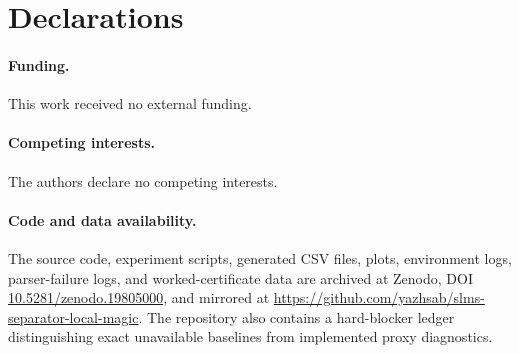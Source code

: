 \documentclass[a4paper,onecolumn,allowtoday]{quantumarticle}
\begin{document}












\section*{Declarations}

\paragraph*{Funding.} This work received no external funding.

\paragraph*{Competing interests.} The authors declare no competing interests.

\paragraph*{Code and data availability.} The source code, experiment scripts, generated CSV files, plots, environment logs, parser-failure logs, and worked-certificate data are archived at Zenodo, DOI \href{https://doi.org/10.5281/zenodo.19805000}{10.5281/zenodo.19805000}, and mirrored at \url{https://github.com/yazhsab/slms-separator-local-magic}. The repository also contains a hard-blocker ledger distinguishing exact unavailable baselines from implemented proxy diagnostics.

\appendix











\end{document}
